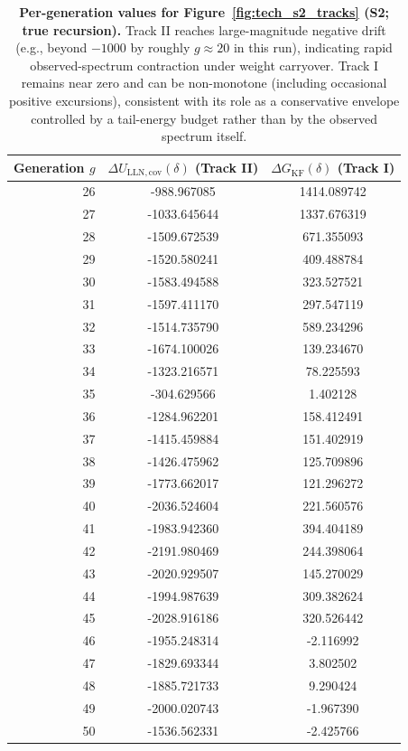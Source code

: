 \documentclass{article}
\theoremstyle{plain}
\theoremstyle{definition}
\theoremstyle{remark}
\begin{document}
\begin{table}[ht!]
\begin{minipage}[t]{0.4\textwidth}
\begin{tabular}{rcc}
\toprule
Generation $g$ & $\Delta U_{\mathrm{LLN,cov}}(\delta)$ (Track II) & $\Delta G_{\mathrm{KF}}(\delta)$ (Track I) \\
\midrule
26 & -988.967085 & 1414.089742 \\
27 & -1033.645644 & 1337.676319 \\
28 & -1509.672539 & 671.355093 \\
29 & -1520.580241 & 409.488784 \\
30 & -1583.494588 & 323.527521 \\
31 & -1597.411170 & 297.547119 \\
32 & -1514.735790 & 589.234296 \\
33 & -1674.100026 & 139.234670 \\
34 & -1323.216571 & 78.225593 \\
35 & -304.629566 & 1.402128 \\
36 & -1284.962201 & 158.412491 \\
37 & -1415.459884 & 151.402919 \\
38 & -1426.475962 & 125.709896 \\
39 & -1773.662017 & 121.296272 \\
40 & -2036.524604 & 221.560576 \\
41 & -1983.942360 & 394.404189 \\
42 & -2191.980469 & 244.398064 \\
43 & -2020.929507 & 145.270029 \\
44 & -1994.987639 & 309.382624 \\
45 & -2028.916186 & 320.526442 \\
46 & -1955.248314 & -2.116992 \\
47 & -1829.693344 & 3.802502 \\
48 & -1885.721733 & 9.290424 \\
49 & -2000.020743 & -1.967390 \\
50 & -1536.562331 & -2.425766 \\
\bottomrule
\end{tabular}
\end{minipage}
\caption{
\textbf{Per-generation values for Figure~\ref{fig:tech_s2_tracks} (S2; true recursion).}
Track II reaches large-magnitude negative drift (e.g., beyond $-1000$ by roughly $g\approx 20$ in this run), indicating rapid observed-spectrum contraction under weight carryover. Track I remains near zero and can be non-monotone (including occasional positive excursions), consistent with its role as a conservative envelope controlled by a tail-energy budget rather than by the observed spectrum itself.
}
\label{tab:tech_s2_table}
\end{table}
\end{document}
